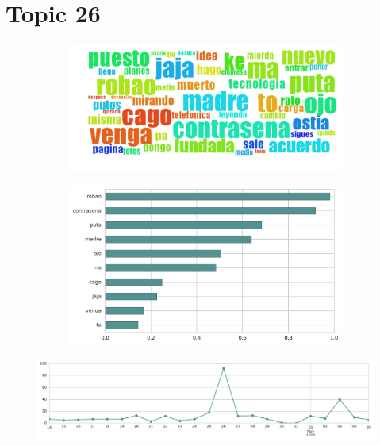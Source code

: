\section{Topic 26}

\begin{figure}[htbp!]
    \centering
    \begin{subfigure}[b]{0.49\textwidth}
        \includegraphics[width=\textwidth]{twitter_all/report_images/topic-26-wordcloud.jpg}
    \end{subfigure}
    \begin{subfigure}[b]{0.49\textwidth}
        \includegraphics[width=\textwidth]{twitter_all/report_images/topic-26-terms.jpg}
    \end{subfigure}
\end{figure}

\begin{figure}[htbp!]
    \centering
    \includegraphics[width=\textwidth]{twitter_all/report_images/topic-26-timeseries.jpg}
\end{figure}

